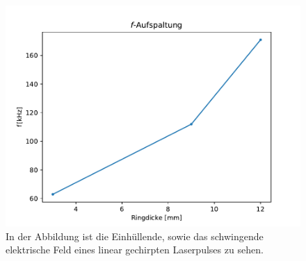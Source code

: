            \begin{figure}[ht]
                \centering
                \includegraphics[scale=0.5]{./pictures/f_Aufspaltung.pdf}
                \caption{In der Abbildung ist die Einhüllende, sowie das schwingende elektrische Feld eines linear gechirpten Laserpulses zu sehen.}
                \label{fig:f_Aufspaltung}
            \end{figure}

